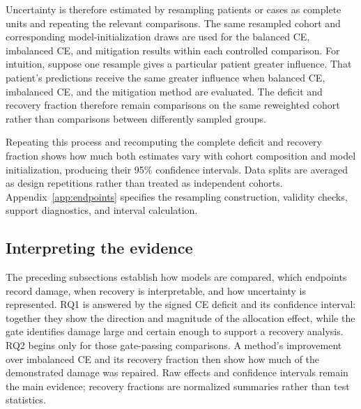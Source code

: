 \documentclass[11pt]{article}
\begin{document}
Uncertainty is therefore estimated by resampling patients or cases as complete units and repeating the relevant comparisons. The same resampled cohort and corresponding model-initialization draws are used for the balanced CE, imbalanced CE, and mitigation results within each controlled comparison. For intuition, suppose one resample gives a particular patient greater influence. That patient's predictions receive the same greater influence when balanced CE, imbalanced CE, and the mitigation method are evaluated. The deficit and recovery fraction therefore remain comparisons on the same reweighted cohort rather than comparisons between differently sampled groups.

Repeating this process and recomputing the complete deficit and recovery fraction shows how much both estimates vary with cohort composition and model initialization, producing their 95\% confidence intervals. Data splits are averaged as design repetitions rather than treated as independent cohorts. Appendix~\ref{app:endpoints} specifies the resampling construction, validity checks, support diagnostics, and interval calculation.

\subsection{Interpreting the evidence}
\label{sec:five-family}
\label{sec:recovery-holm}
The preceding subsections establish how models are compared, which endpoints record damage, when recovery is interpretable, and how uncertainty is represented. RQ1 is answered by the signed CE deficit and its confidence interval: together they show the direction and magnitude of the allocation effect, while the gate identifies damage large and certain enough to support a recovery analysis. RQ2 begins only for those gate-passing comparisons. A method's improvement over imbalanced CE and its recovery fraction then show how much of the demonstrated damage was repaired. Raw effects and confidence intervals remain the main evidence; recovery fractions are normalized summaries rather than test statistics.
\end{document}
